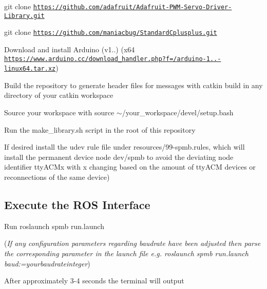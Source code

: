 \begin{DoxyItemize}
\item {\ttfamily git clone \href{https://github.com/adafruit/Adafruit-PWM-Servo-Driver-Library.git}{\tt https\+://github.\+com/adafruit/\+Adafruit-\/\+P\+W\+M-\/\+Servo-\/\+Driver-\/\+Library.\+git}}
\item {\ttfamily git clone \href{https://github.com/maniacbug/StandardCplusplus.git}{\tt https\+://github.\+com/maniacbug/\+Standard\+Cplusplus.\+git}}
\item Download and install Arduino (v1..) (x64 \href{https://www.arduino.cc/download_handler.php?f=/arduino-1.8.5-linux64.tar.xz}{\tt https\+://www.\+arduino.\+cc/download\+\_\+handler.\+php?f=/arduino-\/1..-\/linux64.\+tar.\+xz})
\item Build the repository to generate header files for messages with {\ttfamily catkin build} in any directory of your catkin workspace
\item Source your workspace with {\ttfamily source $\sim$/your\+\_\+workspace/devel/setup.bash}
\item Run the {\ttfamily make\+\_\+library.\+sh} script in the root of this repository
\item If desired install the udev rule file under {\ttfamily resources/99-\/spmb.\+rules}, which will install the permanent device node {\ttfamily dev/spmb} to avoid the deviating node identifier tty\+A\+C\+Mx with x changing based on the amount of tty\+A\+CM devices or reconnections of the same device)
\end{DoxyItemize}

\subsection*{Execute the R\+OS Interface}


\begin{DoxyItemize}
\item Run {\ttfamily roslaunch spmb run.\+launch}
\end{DoxyItemize}

({\itshape If any configuration parameters regarding baudrate have been adjusted then parse the corresponding parameter in the launch file e.\+g. {\ttfamily roslaunch spmb run.\+launch baud\+:=yourbaudrateinteger}})


\begin{DoxyItemize}
\item After approximately 3-\/4 seconds the terminal will output
\end{DoxyItemize}


